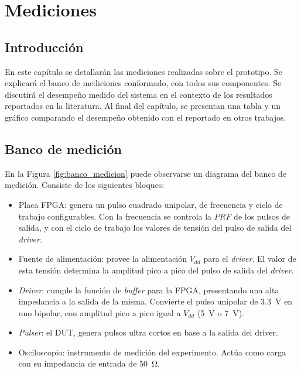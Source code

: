\chapter{Mediciones}

\section{Introducción}

En este capítulo se detallarán las mediciones realizadas sobre el prototipo. Se
explicará el banco de mediciones conformado, con todos sus componentes. Se
discutirá el desempeño medido del sistema en el contexto de los resultados
reportados en la literatura. Al final del capítulo, se presentan una tabla y un
gráfico comparando el desempeño obtenido con el reportado en otros trabajos.

\section{Banco de medición}

En la Figura \ref{fig:banco_medicion} puede observarse un diagrama del banco de
medición. Consiste de los siguientes bloques:

\begin{itemize}
    \item Placa FPGA: genera un pulso cuadrado unipolar, de frecuencia y ciclo
      de trabajo configurables. Con la frecuencia se controla la $PRF$ de los
      pulsos de salida, y con el ciclo de trabajo los valores de tensión del
      pulso de salida del \textit{driver}.
    \item Fuente de alimentación: provee la alimentación $V_{dd}$ para el
     \textit{driver}. El valor de esta tensión determina la amplitud pico a pico del
      pulso de salida del \textit{driver}.
    \item \textit{Driver}: cumple la función de \textit{buffer} para la
	FPGA, presentando una alta impedancia a la salida de la misma.
      Convierte el pulso unipolar de \qty{3.3}{\volt} en uno bipolar, con
      amplitud pico a pico igual a $V_{dd}$ (\qty{5}{\volt} o \qty{7}{\volt}).
    \item \textit{Pulser}: el DUT, genera pulsos ultra cortos en base
      a la salida del driver.
    \item Osciloscopio: instrumento de medición del experimento. Actúa como
      carga con su impedancia de entrada de \qty{50}{\ohm}.
\end{itemize}

